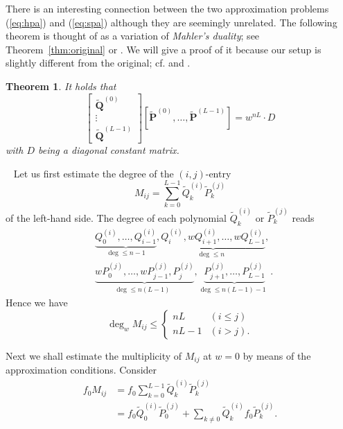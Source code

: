 \documentclass[12pt]{article}
\newtheorem{thm}{Theorem}[section]
\numberwithin{equation}{section}
\def\pf{\noindent{\it Proof.} \ }
\begin{document}
There is an interesting connection between the two approximation problems 
(\ref{eq:hpa}) and (\ref{eq:spa})
although they are seemingly unrelated.
The following theorem is thought of as a variation of 
{\it Mahler's duality}; 
see Theorem~\ref{thm:original} or \cite{mah68}.
We will give a proof of it
because our setup is 
slightly 
different from the original;
cf. \cite[Theorem~8.1.2]{bg-m96}
and
\cite{coa66}.



\begin{thm}
\label{thm:dual}
 It holds that
\[
\begin{bmatrix} 
\widetilde{\boldsymbol Q}^{(0)}
\\
\vdots
\\
\widetilde{\boldsymbol Q}^{(L-1)}
\end{bmatrix}
\left[
\widetilde{\boldsymbol P}^{(0)}, \ldots,\widetilde{\boldsymbol P}^{(L-1)}
\right]=w^{nL} \cdot D
\]
with $D$ being a diagonal constant matrix.
\end{thm}


\pf
Let us first estimate the degree of the $(i,j)$-entry
\[
M_{ij}=\sum_{k=0}^{L-1} \widetilde{Q}_k^{(i)} \widetilde{P}_k^{(j)}
\]
of the left-hand side.
The degree of each polynomial $\widetilde{Q}_k^{(i)}$ or $\widetilde{P}_k^{(j)}$ 
reads 
\begin{align*}
&
\underbrace{Q_0^{(i)}, \ldots ,Q_{i-1}^{(i)}}_{\text{$\deg \leq n-1$}},  
\underbrace{Q_i^{(i)}, w Q_{i+1}^{(i)},  \ldots ,w Q_{L-1}^{(i)}}_{\text{$\deg \leq n$ }},
\\ 
&
\underbrace{w P_0^{(j)}, \ldots , w P_{j-1}^{(j)}, P_{j}^{(j)}}_{\text{$\deg \leq n(L-1)$ }},
\underbrace{P_{j+1}^{(j)}, \ldots ,P_{L-1}^{(j)} }_{\text{$\deg \leq n(L-1)-1$ }}.
\end{align*}
Hence we have
\begin{equation}
 \label{eq:degM}
\deg_w M_{ij} \leq
\left\{ 
\begin{array}{ll}
n L & (i \leq j)
\\
n L-1 & (i > j).
\end{array}
\right.
\end{equation}




Next we shall estimate the multiplicity of $M_{ij}$
at $w=0$
by means of the
 approximation conditions.
Consider 
\begin{align*}
f_0  M_{ij} &= f_0 \sum_{k=0}^{L-1} \widetilde{Q}_k^{(i)} \widetilde{P}_k^{(j)}
\\
&= f_0\widetilde{Q}_0^{(i)} \widetilde{P}_0^{(j)}
+ \sum_{k \neq 0} \widetilde{Q}_k^{(i)} f_0 \widetilde{P}_k^{(j)}.
\end{align*}
\end{document}
